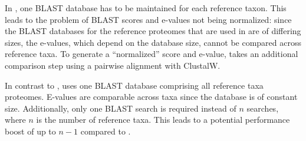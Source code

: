 In \hamstr, one BLAST database has to be maintained for each reference taxon.
This leads to the problem of BLAST scores and e-values not being normalized:
since the BLAST databases for the reference proteomes that are used in \hamstr
are of differing sizes, the e-values, which depend on the database size, cannot
be compared across reference taxa. To generate a ``normalized'' score and
e-value, \hamstr takes an additional comparison step using a pairwise alignment
with ClustalW.

In contrast to \hamstr, \pname uses one BLAST database comprising all reference
taxa proteomes. E-values are comparable across taxa since the database is of
constant size. Additionally, only one BLAST search is required instead of $n$
searches, where $n$ is the number of reference taxa. This leads to a potential
performance boost of up to $n-1$ compared to \hamstr.
